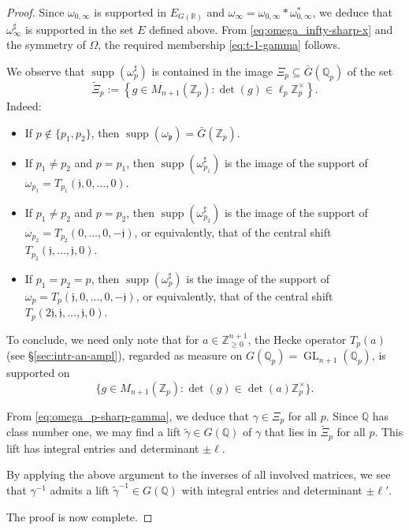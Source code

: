 \documentclass[reqno]{amsart}
\DeclareMathOperator{\GL}{GL}
\DeclareMathOperator{\supp}{supp}
\theoremstyle{plain} \newtheorem{theorem} {Theorem}
\theoremstyle{definition} \newtheorem{definition} [theorem] {Definition}
\theoremstyle{itplain} %
\numberwithin{equation}{section}
\numberwithin{theorem}{section}
\renewcommand{\geq}{\geqslant}
\begin{document}
\begin{proof}
  Since $\omega_{0,\infty}$ is supported in $E_{G(\mathbb{R})}$ and $\omega_{\infty} = \omega_{0,\infty} \ast \omega_{0,\infty}^*$, we deduce that $\omega _\infty ^\sharp$ is supported in the set $E$ defined above.  From \eqref{eq:omega_infty-sharp-x} and the symmetry of $\Omega$, the required membership \eqref{eq:t-1-gamma} follows.
  
  We observe that $\supp(\omega_{p}^\sharp)$ is contained in the image $\Xi_p \subseteq \bar{G}(\mathbb{Q}_p)$ of the set
  \begin{equation*}
    \tilde{\Xi}_p := \left\{ g \in M_{n+1}(\mathbb{Z}_p) : \det(g) \in \ell_p \mathbb{Z}_p^\times  \right\}.
  \end{equation*}
  Indeed:
  \begin{itemize}
  \item If $p \notin \{p_1, p_2\}$, then $\supp(\omega_{\mathfrak{p}}) = \bar{G}(\mathbb{Z}_p)$.
  \item If $p_1 \neq p_2$ and $p = p_1$, then $\supp(\omega_{p_1}^\sharp)$ is the image of the support of $\omega_{p_1} = T_{p_1}(\mathfrak{j},0,\dotsc,0)$.
  \item If $p_1 \neq p_2$ and $p = p_2$, then $\supp(\omega_{p_2}^\sharp)$ is the image of the support of $\omega_{p_2} = T_{p_2}(0,\dotsc,0,-\mathfrak{j})$, or equivalently, that of the central shift $T_{p_2}(\mathfrak{j},\dotsc,\mathfrak{j},0)$.
  \item If $p_1 = p_2 = p$, then $\supp(\omega_p^\sharp)$ is the image of the support of $\omega_p = T_p(\mathfrak{j},0,\dotsc,0,-\mathfrak{j})$, or equivalently, that of the central shift $T_p(2 \mathfrak{j}, \mathfrak{j}, \dotsc, \mathfrak{j}, 0)$.
  \end{itemize}
  To conclude, we need only note that for $a \in \mathbb{Z}_{\geq 0}^{n+1}$, the Hecke operator $T_p(a)$ (see \S\ref{sec:intr-an-ampl}), regarded as measure on $G(\mathbb{Q}_p) = \GL_{n+1}(\mathbb{Q}_p)$, is supported on
  \begin{equation*}
\{g \in M_{n+1}(\mathbb{Z}_p) : \det(g) \in \det(a) \mathbb{Z}_p^\times \}.
\end{equation*}

  
  From \eqref{eq:omega_p-sharp-gamma}, we deduce that $\gamma \in \Xi_p$ for all $p$.  Since $\mathbb{Q}$ has class number one, we may find a lift $\tilde{\gamma} \in G(\mathbb{Q})$ of $\gamma$ that lies in $\tilde{\Xi}_p$ for all $p$.  This lift has integral entries and determinant $\pm \ell$.

  By applying the above argument to the inverses of all involved matrices, we see that $\gamma^{-1}$ admits a lift $\tilde{\gamma}^{-1} \in G(\mathbb{Q})$ with integral entries and determinant $\pm \ell '$.

  The proof is now complete.
\end{proof}
\end{document}
